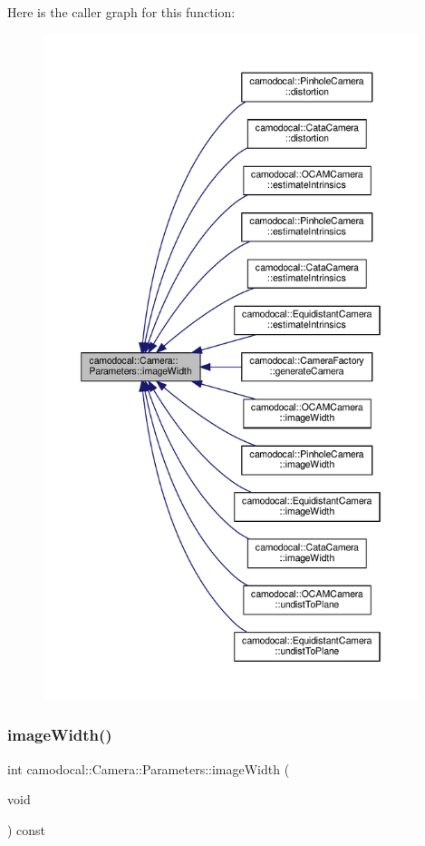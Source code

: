 Here is the caller graph for this function\+:\nopagebreak
\begin{figure}[H]
\begin{center}
\leavevmode
\includegraphics[height=550pt]{classcamodocal_1_1Camera_1_1Parameters_a92c11d296cb64c91a0c15528a8a7b813_icgraph}
\end{center}
\end{figure}
\mbox{\label{classcamodocal_1_1Camera_1_1Parameters_ad18cfb16816d1385f7e9494056bcb508}} 
\subsubsection{\texorpdfstring{image\+Width()}{imageWidth()}\hspace{0.1cm}{\footnotesize\ttfamily [2/2]}}
{\footnotesize\ttfamily int camodocal\+::\+Camera\+::\+Parameters\+::image\+Width (\begin{DoxyParamCaption}\item[{void}]{ }\end{DoxyParamCaption}) const}



